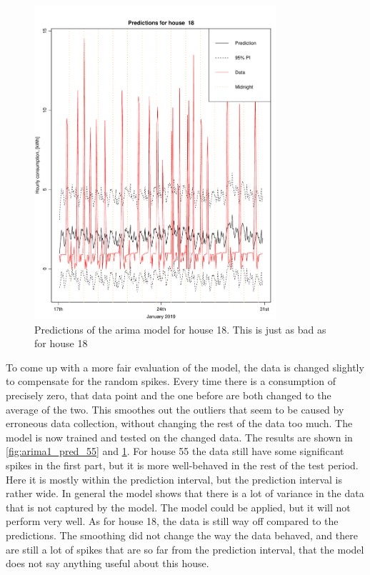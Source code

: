 \begin{figure}
    \centering
    \includegraphics[width=0.8\textwidth]{../../../figures/arimax/arima1_pred_18.pdf}
    \caption{Predictions of the arima model for house 18. This is just as bad as for house 18}
    \label{fig:arima1_pred_18}
\end{figure}



\noindent To come up with a more fair evaluation of the model, the data is changed slightly to compensate for the random spikes. Every time there is a consumption of precisely zero, that data point and the one before are both changed to the average of the two. This smoothes out the outliers that seem to be caused by erroneous data collection, without changing the rest of the data too much. The model is now trained and tested on the changed data. The results are shown in \cref{fig:arima1_pred_55} and \cref{fig:arima1_pred_18}. For house 55 the data still have some significant spikes in the first part, but it is more well-behaved in the rest of the test period. Here it is mostly within the prediction interval, but the prediction interval is rather wide. In general the model shows that there is a lot of variance in the data that is not captured by the model. The model could be applied, but it will not perform very well. As for house 18, the data is still way off compared to the predictions. The smoothing did not change the way the data behaved, and there are still a lot of spikes that are so far from the prediction interval, that the model does not say anything useful about this house.


